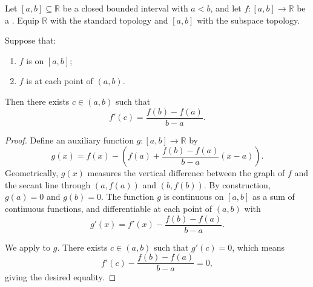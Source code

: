 \begin{theorem} \label{theorem:mean_value_theorem_for_differentiable_functions_on_intervals}
    Let $[a, b] \subseteq \mathbb{R}$ be a closed bounded interval with $a < b$, and let $f : [a, b] \to \mathbb{R}$ be a . Equip $\mathbb{R}$ with the standard topology and $[a, b]$ with the subspace topology.

    Suppose that:
    \begin{enumerate}
        \item $f$ is  on $[a, b]$;
        \item $f$ is  at each point of $(a, b)$.
    \end{enumerate}
    Then there exists $c \in (a, b)$ such that
    $$f'(c) = \frac{f(b) - f(a)}{b - a}.$$
\end{theorem}

\begin{proof}
    Define an auxiliary function $g : [a, b] \to \mathbb{R}$ by
    $$g(x) = f(x) - \left( f(a) + \frac{f(b) - f(a)}{b - a}(x - a) \right).$$
    Geometrically, $g(x)$ measures the vertical difference between the graph of $f$ and the secant line through $(a, f(a))$ and $(b, f(b))$. By construction, $g(a) = 0$ and $g(b) = 0$. The function $g$ is continuous on $[a, b]$ as a sum of continuous functions, and differentiable at each point of $(a, b)$ with
    $$g'(x) = f'(x) - \frac{f(b) - f(a)}{b - a}.$$

    We apply  to $g$. There exists $c \in (a, b)$ such that $g'(c) = 0$, which means
    $$f'(c) - \frac{f(b) - f(a)}{b - a} = 0,$$
    giving the desired equality.
\end{proof}
